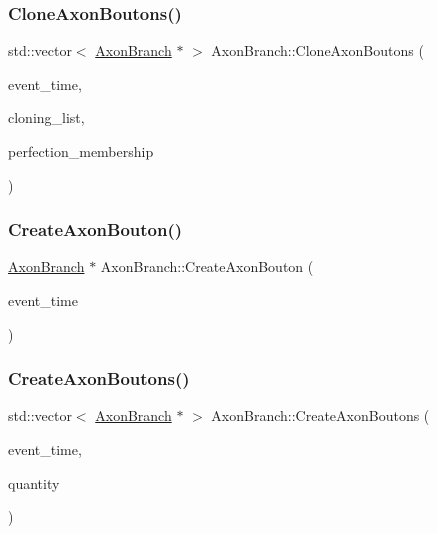 \mbox{\label{classAxonBranch_a842b3875b2771f4b8e7316bfb9af894c}} 
\subsubsection{\texorpdfstring{Clone\+Axon\+Boutons()}{CloneAxonBoutons()}}
{\footnotesize\ttfamily std\+::vector$<$ \mbox{\hyperlink{classAxonBranch}{Axon\+Branch}} $\ast$ $>$ Axon\+Branch\+::\+Clone\+Axon\+Boutons (\begin{DoxyParamCaption}\item[{std\+::chrono\+::time\+\_\+point$<$ \mbox{\hyperlink{universe_8h_a0ef8d951d1ca5ab3cfaf7ab4c7a6fd80}{Clock}} $>$}]{event\+\_\+time,  }\item[{std\+::vector$<$ \mbox{\hyperlink{classAxonBranch}{Axon\+Branch}} $\ast$$>$}]{cloning\+\_\+list,  }\item[{double}]{perfection\+\_\+membership }\end{DoxyParamCaption})}

\mbox{\label{classAxonBranch_a30b4602e5dd121666478ff9de52d022b}} 
\subsubsection{\texorpdfstring{Create\+Axon\+Bouton()}{CreateAxonBouton()}}
{\footnotesize\ttfamily \mbox{\hyperlink{classAxonBranch}{Axon\+Branch}} $\ast$ Axon\+Branch\+::\+Create\+Axon\+Bouton (\begin{DoxyParamCaption}\item[{std\+::chrono\+::time\+\_\+point$<$ \mbox{\hyperlink{universe_8h_a0ef8d951d1ca5ab3cfaf7ab4c7a6fd80}{Clock}} $>$}]{event\+\_\+time }\end{DoxyParamCaption})}

\mbox{\label{classAxonBranch_a77e93626a7993f76e689d09721974e90}} 
\subsubsection{\texorpdfstring{Create\+Axon\+Boutons()}{CreateAxonBoutons()}}
{\footnotesize\ttfamily std\+::vector$<$ \mbox{\hyperlink{classAxonBranch}{Axon\+Branch}} $\ast$ $>$ Axon\+Branch\+::\+Create\+Axon\+Boutons (\begin{DoxyParamCaption}\item[{std\+::chrono\+::time\+\_\+point$<$ \mbox{\hyperlink{universe_8h_a0ef8d951d1ca5ab3cfaf7ab4c7a6fd80}{Clock}} $>$}]{event\+\_\+time,  }\item[{int}]{quantity }\end{DoxyParamCaption})}

